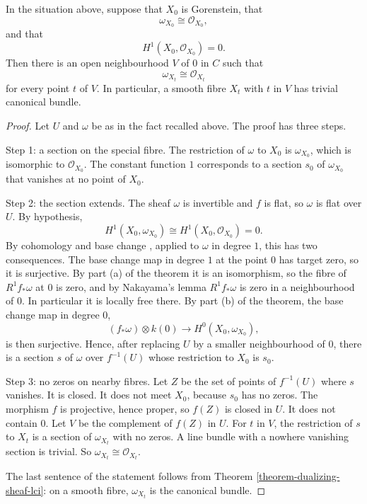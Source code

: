 \begin{proposition}
\label{proposition-trivial-dualizing-nearby}
In the situation above, suppose that
$X_0$ is Gorenstein, that
$$
\omega_{X_0}\cong\mathcal{O}_{X_0},
$$
and that
$$
H^1(X_0,\mathcal{O}_{X_0})=0.
$$
Then there is an open neighbourhood $V$
of $0$ in $C$ such that
$$
\omega_{X_t}\cong\mathcal{O}_{X_t}
$$
for every point $t$ of $V$. In
particular, a smooth fibre $X_t$ with $t$
in $V$ has trivial canonical bundle.
\end{proposition}

\begin{proof}
Let $U$ and $\omega$ be as in the fact
recalled above. The proof has three
steps.

Step 1: a section on the special fibre.
The restriction of $\omega$ to $X_0$ is
$\omega_{X_0}$, which is isomorphic to
$\mathcal{O}_{X_0}$. The constant
function $1$ corresponds to a section
$s_0$ of $\omega_{X_0}$ that vanishes at
no point of $X_0$.

Step 2: the section extends. The sheaf
$\omega$ is invertible and $f$ is flat,
so $\omega$ is flat over $U$. By
hypothesis,
$$
H^1(X_0,\omega_{X_0})\cong
H^1(X_0,\mathcal{O}_{X_0})=0.
$$
By cohomology and base change \cite[III,
Theorem 12.11]{har}, applied to $\omega$ in
degree $1$, this has two consequences. The
base change map in degree $1$ at the point
$0$ has target zero, so it is surjective. By
part (a) of the theorem it is an isomorphism,
so the fibre of $R^1f_*\omega$ at $0$ is
zero, and by Nakayama's lemma $R^1f_*\omega$
is zero in a neighbourhood of $0$. In
particular it is locally free there. By part
(b) of the theorem, the base change map in
degree $0$,
$$
(f_*\omega)\otimes k(0)\to
H^0(X_0,\omega_{X_0}),
$$
is then surjective. Hence, after replacing
$U$
by a smaller neighbourhood of $0$, there
is a section $s$ of $\omega$ over
$f^{-1}(U)$ whose restriction to $X_0$ is
$s_0$.

Step 3: no zeros on nearby fibres. Let
$Z$ be the set of points of $f^{-1}(U)$
where $s$ vanishes. It is closed. It does
not meet $X_0$, because $s_0$ has no
zeros. The morphism $f$ is projective,
hence proper, so $f(Z)$ is closed in $U$.
It does not contain $0$. Let $V$ be the
complement of $f(Z)$ in $U$. For $t$ in
$V$, the restriction of $s$ to $X_t$ is a
section of $\omega_{X_t}$ with no zeros.
A line bundle with a nowhere vanishing
section is trivial. So
$\omega_{X_t}\cong\mathcal{O}_{X_t}$.

The last sentence of the statement
follows from Theorem
\ref{theorem-dualizing-sheaf-lci}: on a
smooth fibre, $\omega_{X_t}$ is the
canonical bundle.
\end{proof}

